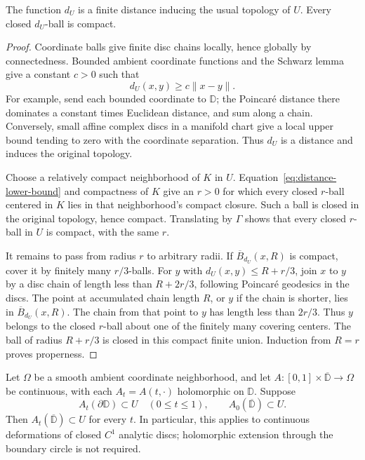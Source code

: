 \begin{proposition}\label{prop:proper-distance}
The function $d_U$ is a finite distance inducing the usual topology of $U$. Every closed $d_U$-ball is compact.
\end{proposition}

\begin{proof}
Coordinate balls give finite disc chains locally, hence globally by connectedness.  Bounded ambient coordinate functions and the Schwarz lemma give a constant $c>0$ such that
\begin{equation}\label{eq:distance-lower-bound}
                         d_U(x,y)\geq c\|x-y\|.
\end{equation}
For example, send each bounded coordinate to $\mathbb{D}$; the Poincar\'e distance there dominates a constant times Euclidean distance, and sum along a chain. Conversely, small affine complex discs in a manifold chart give a local upper bound tending to zero with the coordinate separation.  Thus $d_U$ is a distance and induces the original topology.

Choose a relatively compact neighborhood of $K$ in $U$. Equation~\eqref{eq:distance-lower-bound} and compactness of $K$ give an $r>0$ for which every closed $r$-ball centered in $K$ lies in that neighborhood's compact closure.  Such a ball is closed in the original topology, hence compact.  Translating by $\Gamma$ shows that every closed $r$-ball in $U$ is compact, with the same $r$.

It remains to pass from radius $r$ to arbitrary radii. If $\overline B_{d_U}(x,R)$ is compact, cover it by finitely many $r/3$-balls. For $y$ with $d_U(x,y)\le R+r/3$, join $x$ to $y$ by a disc chain of length less than $R+2r/3$, following Poincar\'e geodesics in the discs. The point at accumulated chain length $R$, or $y$ if the chain is shorter, lies in $\overline B_{d_U}(x,R)$. The chain from that point to $y$ has length less than $2r/3$. Thus $y$ belongs to the closed $r$-ball about one of the finitely many covering centers. The ball of radius $R+r/3$ is closed in this compact finite union. Induction from $R=r$ proves properness.
\end{proof}

\begin{lemma}\label{lem:continuity}
Let $\Omega$ be a smooth ambient coordinate neighborhood, and let $A:[0,1]\times\overline{\mathbb{D}}\to\Omega$ be continuous, with each $A_t=A(t,\cdot)$ holomorphic on $\mathbb{D}$.  Suppose
\[
  A_t(\partial\mathbb{D})\subset U\quad(0\leq t\leq1),
  \qquad A_0(\overline{\mathbb{D}})\subset U.
\]
Then $A_t(\overline{\mathbb{D}})\subset U$ for every $t$.  In particular, this applies to continuous deformations of closed $C^1$ analytic discs; holomorphic extension through the boundary circle is not required.
\end{lemma}


